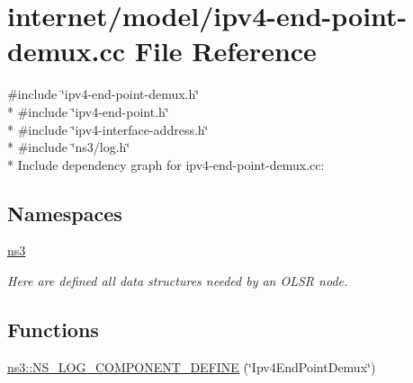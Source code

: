 \hypertarget{ipv4-end-point-demux_8cc}{}\section{internet/model/ipv4-\/end-\/point-\/demux.cc File Reference}
\label{ipv4-end-point-demux_8cc}
{\ttfamily \#include \char`\"{}ipv4-\/end-\/point-\/demux.\+h\char`\"{}}\\*
{\ttfamily \#include \char`\"{}ipv4-\/end-\/point.\+h\char`\"{}}\\*
{\ttfamily \#include \char`\"{}ipv4-\/interface-\/address.\+h\char`\"{}}\\*
{\ttfamily \#include \char`\"{}ns3/log.\+h\char`\"{}}\\*
Include dependency graph for ipv4-\/end-\/point-\/demux.cc\+:
\subsection*{Namespaces}
\begin{DoxyCompactItemize}
\item 
 \hyperlink{namespacens3}{ns3}
\begin{DoxyCompactList}\small\item\em Here are defined all data structures needed by an O\+L\+SR node. \end{DoxyCompactList}\end{DoxyCompactItemize}
\subsection*{Functions}
\begin{DoxyCompactItemize}
\item 
\hyperlink{namespacens3_aeed458f1ec0c61923a4cb633d722f4ea}{ns3\+::\+N\+S\+\_\+\+L\+O\+G\+\_\+\+C\+O\+M\+P\+O\+N\+E\+N\+T\+\_\+\+D\+E\+F\+I\+NE} (\char`\"{}Ipv4\+End\+Point\+Demux\char`\"{})
\end{DoxyCompactItemize}
